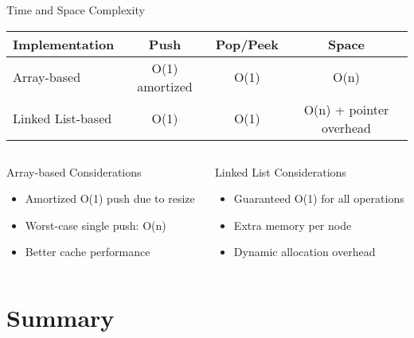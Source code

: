 \documentclass[aspectratio=169,xcolor=dvipsnames]{beamer}
\begin{document}
\begin{frame}{Time and Space Complexity}
  \begin{center}
    \begin{tabular}{l|c|c|c}
      \toprule
      \textbf{Implementation} & \textbf{Push} & \textbf{Pop/Peek} & \textbf{Space} \\
      \midrule
      Array-based & O(1) amortized & O(1) & O(n) \\
      Linked List-based & O(1) & O(1) & O(n) + pointer overhead \\
      \bottomrule
    \end{tabular}
  \end{center}
  
  \vspace{0.5cm}
  
  \begin{columns}
    \begin{column}{0.48\textwidth}
      \begin{block}{Array-based Considerations}
        \begin{itemize}
          \item Amortized O(1) push due to resize
          \item Worst-case single push: O(n)
          \item Better cache performance
        \end{itemize}
      \end{block}
    \end{column}
    \begin{column}{0.48\textwidth}
      \begin{block}{Linked List Considerations}
        \begin{itemize}
          \item Guaranteed O(1) for all operations
          \item Extra memory per node
          \item Dynamic allocation overhead
        \end{itemize}
      \end{block}
    \end{column}
  \end{columns}
\end{frame}

\section{Summary}
\end{document}
